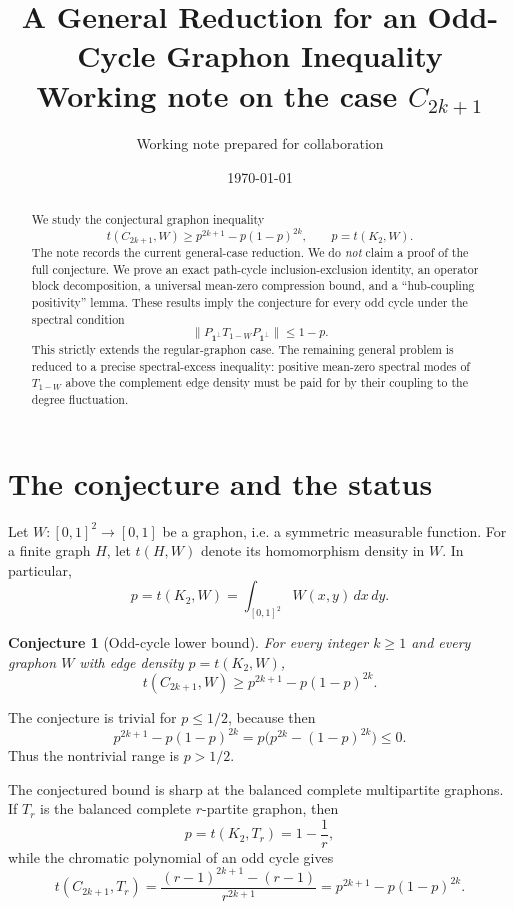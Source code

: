 \documentclass[11pt]{article}
\title{A General Reduction for an Odd-Cycle Graphon Inequality\\
\large Working note on the case $C_{2k+1}$}
\author{Working note prepared for collaboration}
\date{\today}
\newtheorem{conjecture}[theorem]{Conjecture}
\theoremstyle{definition}
\theoremstyle{remark}
\newcommand{\one}{\mathbf 1}
\begin{document}
\maketitle

\begin{abstract}
We study the conjectural graphon inequality
\[
  t(C_{2k+1},W)\ge p^{2k+1}-p(1-p)^{2k},
  \qquad p=t(K_2,W).
\]
The note records the current general-case reduction.  We do \emph{not} claim a proof of the full conjecture.  We prove an exact path-cycle inclusion-exclusion identity, an operator block decomposition, a universal mean-zero compression bound, and a ``hub-coupling positivity'' lemma.  These results imply the conjecture for every odd cycle under the spectral condition
\[
  \|P_{\one^\perp}T_{1-W}P_{\one^\perp}\|\le 1-p.
\]
This strictly extends the regular-graphon case.  The remaining general problem is reduced to a precise spectral-excess inequality: positive mean-zero spectral modes of $T_{1-W}$ above the complement edge density must be paid for by their coupling to the degree fluctuation.
\end{abstract}

\tableofcontents

\section{The conjecture and the status}

Let $W\colon [0,1]^2\to[0,1]$ be a graphon, i.e. a symmetric measurable function.  For a finite graph $H$, let $t(H,W)$ denote its homomorphism density in $W$.  In particular,
\[
  p=t(K_2,W)=\int_{[0,1]^2} W(x,y)\,dx\,dy.
\]

\begin{conjecture}[Odd-cycle lower bound]\label{conj:main}
For every integer $k\ge1$ and every graphon $W$ with edge density $p=t(K_2,W)$,
\[
  t(C_{2k+1},W)\ge p^{2k+1}-p(1-p)^{2k}.
\]
\end{conjecture}

The conjecture is trivial for $p\le1/2$, because then
\[
  p^{2k+1}-p(1-p)^{2k}=p\bigl(p^{2k}-(1-p)^{2k}\bigr)\le0.
\]
Thus the nontrivial range is $p>1/2$.

The conjectured bound is sharp at the balanced complete multipartite graphons.  If $T_r$ is the balanced complete $r$-partite graphon, then
\[
  p=t(K_2,T_r)=1-\frac1r,
\]
while the chromatic polynomial of an odd cycle gives
\[
  t(C_{2k+1},T_r)
  =\frac{(r-1)^{2k+1}-(r-1)}{r^{2k+1}}
  =p^{2k+1}-p(1-p)^{2k}.
\]
\end{document}
